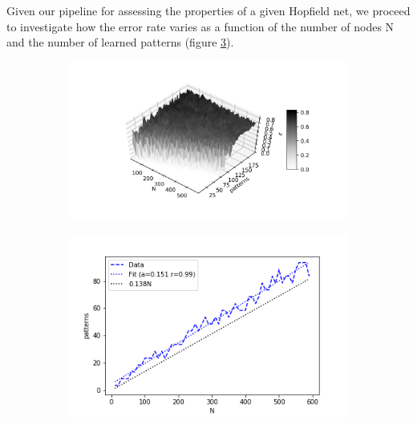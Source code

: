 \documentclass{article}
\begin{document}
Given our pipeline for assessing the properties of a given Hopfield net, we proceed to investigate how the error rate varies as a function of the number of nodes N and the number of learned patterns (figure \ref{fig:N_samp}).

\begin{figure}[h]
	\centering
	\begin{subfigure}[t]{0.50\linewidth}
		\centering
		\includegraphics[width = 1.0\linewidth, trim={100 30 50 40}, clip=true]{scan_N_npat.png}
		\label{fig:N}	
	\end{subfigure}%
	\hspace{0.001\linewidth}
	\begin{subfigure}[t]{0.45\linewidth}
		\centering
		\includegraphics[width = 1.0\linewidth, trim={0 7 0 0}, clip=true]{hebb_thresh.png}
		\label{fig:Nthresh}	
	\end{subfigure}%
\label{fig:N_samp}
\end{figure}
\end{document}
